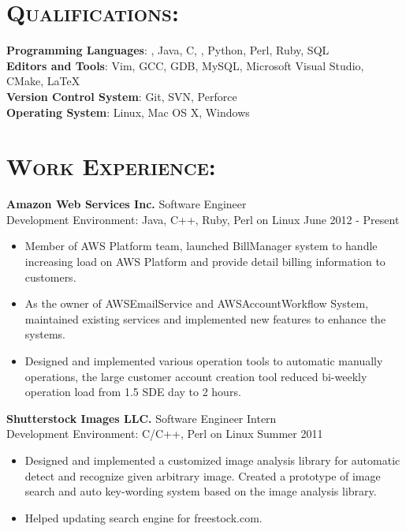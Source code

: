 \begin{resume}
\section{\textsc{Qualifications:}}

\textbf{Programming Languages}: \Cplusplus, Java, C, \CSharp, Python, Perl, Ruby, SQL \\
\textbf{Editors and Tools}: Vim, GCC, GDB, MySQL, Microsoft Visual Studio, CMake, \LaTeX \\
\textbf{Version Control System}: Git, SVN, Perforce \\
\textbf{Operating System}: Linux, Mac OS X, Windows 


\section{\textsc{Work Experience:}}
\textbf{Amazon Web Services Inc.} \hfill Software Engineer\\
Development Environment: Java, C++, Ruby, Perl on Linux \hfill June 2012 - Present
\begin{itemize}
	\item Member of AWS Platform team, launched BillManager system to handle increasing load on AWS Platform and provide  detail billing information to customers.
	\item As the owner of AWSEmailService and AWSAccountWorkflow System, maintained existing services and implemented new features to enhance the systems.
	\item Designed and implemented various operation tools to automatic manually operations, the large customer account creation tool reduced bi-weekly operation load from 1.5 SDE day to 2 hours. 
\end{itemize}
\textbf{Shutterstock Images LLC.} \hfill Software Engineer Intern\\
Development Environment: C/C++, Perl on Linux \hfill Summer 2011
\begin{itemize}
    \item Designed and implemented a customized image analysis library for automatic detect and recognize given arbitrary image. Created a prototype of image search and auto key-wording system based on the image analysis library.
    \item Helped updating search engine for freestock.com.
\end{itemize}



\end{resume}
